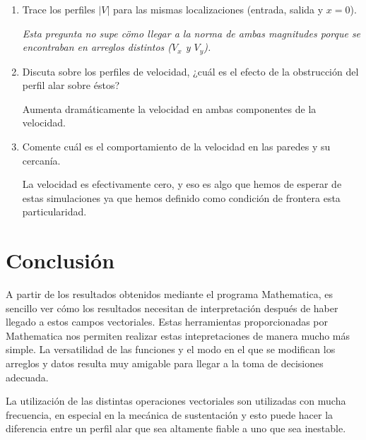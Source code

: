 \documentclass[12pt, letterpaper]{article}
\begin{document}
\begin{enumerate}
	\item Trace los perfiles $|V|$ para las mismas localizaciones (entrada, salida y $x = 0$).

		\textit{Esta pregunta no supe cömo llegar a la norma de ambas magnitudes porque se encontraban en arreglos distintos ($V_x$ y $V_y$).}
	\item Discuta sobre los perfiles de velocidad, ¿cuál es el efecto de la obstrucción del perfil alar sobre éstos?

		Aumenta dramáticamente la velocidad en ambas componentes de la velocidad.
	\item Comente cuál es el comportamiento de la velocidad en las paredes y su cercanía.

		La velocidad es efectivamente cero, y eso es algo que hemos de esperar de estas simulaciones ya que hemos definido como condición de frontera esta particularidad.

\end{enumerate}

\section*{Conclusión}
A partir de los resultados obtenidos mediante el programa Mathematica, es sencillo ver cómo los resultados necesitan de interpretación después de haber llegado a estos campos vectoriales. Estas herramientas proporcionadas por Mathematica nos permiten realizar estas intepretaciones de manera mucho más simple. La versatilidad de las funciones y el modo en el que se modifican los arreglos y datos resulta muy amigable para llegar a la toma de decisiones adecuada.

La utilización de las distintas operaciones vectoriales son utilizadas con mucha frecuencia, en especial en la mecánica de sustentación y esto puede hacer la diferencia entre un perfil alar que sea altamente fiable a uno que sea inestable.

\renewcommand\refname{References}
\printbibliography
\end{document}

